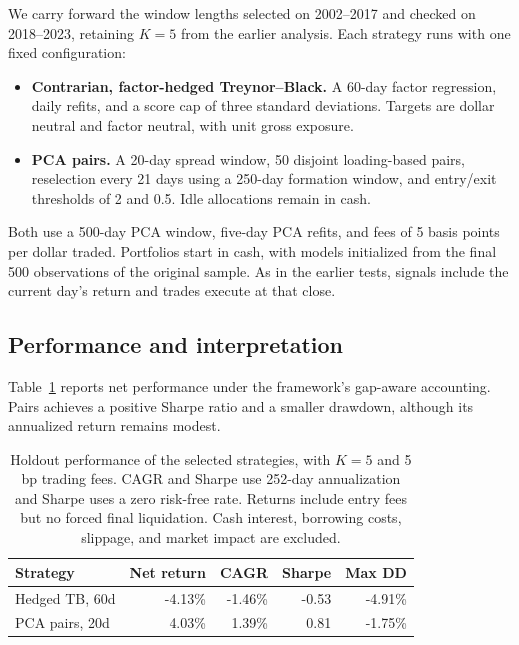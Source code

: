 \documentclass[12pt,letterpaper]{article}
\begin{document}
We carry forward the window lengths selected on 2002--2017 and checked on
2018--2023, retaining $K=5$ from the earlier analysis. Each strategy runs with
one fixed configuration:
\begin{itemize}
    \item \textbf{Contrarian, factor-hedged Treynor--Black.} A 60-day
    factor regression, daily refits, and a score cap of three standard
    deviations. Targets are dollar neutral and factor neutral, with unit
    gross exposure.
    \item \textbf{PCA pairs.} A 20-day spread window, 50 disjoint
    loading-based pairs, reselection every 21 days using a 250-day formation
    window, and entry/exit thresholds of 2 and 0.5. Idle allocations remain
    in cash.
\end{itemize}
Both use a 500-day PCA window, five-day PCA refits, and fees of 5 basis
points per dollar traded. Portfolios start in cash, with models initialized
from the final 500 observations of the original sample. As in the earlier
tests, signals include the current day's return and trades execute at that
close.

\subsection{Performance and interpretation}

Table~\ref{tab:final-holdout} reports net performance under the framework's
gap-aware accounting. Pairs achieves a positive Sharpe ratio and a smaller
drawdown, although its annualized return remains modest.

\begin{table}[htbp]
\centering
\small
\begin{tabular}{lrrrr}
\toprule
Strategy & Net return & CAGR & Sharpe & Max DD \\
\midrule
Hedged TB, 60d & -4.13\% & -1.46\% & -0.53 & -4.91\% \\
PCA pairs, 20d & 4.03\% & 1.39\% & 0.81 & -1.75\% \\
\bottomrule
\end{tabular}
\caption{Holdout performance of the selected strategies, with $K=5$ and
5 bp trading fees. CAGR and Sharpe use 252-day annualization and Sharpe uses
a zero risk-free rate. Returns include entry fees but no forced final
liquidation. Cash interest, borrowing costs, slippage, and market impact
are excluded.}
\label{tab:final-holdout}
\end{table}
\end{document}
